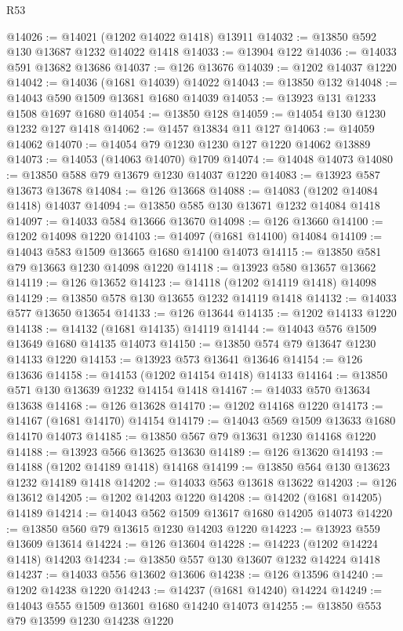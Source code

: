 \begin{lexlean}{R53}
\begin{coremodule}
@14026 := @14021 (@1202 @14022 @1418) @13911
@14032 := @13850 @592 @130 @13687 @1232 @14022 @1418
@14033 := @13904 @122
@14036 := @14033 @591 @13682 @13686
@14037 := @126 @13676
@14039 := @1202 @14037 @1220
@14042 := @14036 (@1681 @14039) @14022
@14043 := @13850 @132
@14048 := @14043 @590 @1509 @13681 @1680 @14039
@14053 := @13923 @131 @1233 @1508 @1697 @1680
@14054 := @13850 @128
@14059 := @14054 @130 @1230 @1232 @127 @1418
@14062 := @1457 @13834 @11 @127
@14063 := @14059 @14062
@14070 := @14054 @79 @1230 @1230 @127 @1220 @14062 @13889
@14073 := @14053 (@14063 @14070) @1709
@14074 := @14048 @14073
@14080 := @13850 @588 @79 @13679 @1230 @14037 @1220
@14083 := @13923 @587 @13673 @13678
@14084 := @126 @13668
@14088 := @14083 (@1202 @14084 @1418) @14037
@14094 := @13850 @585 @130 @13671 @1232 @14084 @1418
@14097 := @14033 @584 @13666 @13670
@14098 := @126 @13660
@14100 := @1202 @14098 @1220
@14103 := @14097 (@1681 @14100) @14084
@14109 := @14043 @583 @1509 @13665 @1680 @14100 @14073
@14115 := @13850 @581 @79 @13663 @1230 @14098 @1220
@14118 := @13923 @580 @13657 @13662
@14119 := @126 @13652
@14123 := @14118 (@1202 @14119 @1418) @14098
@14129 := @13850 @578 @130 @13655 @1232 @14119 @1418
@14132 := @14033 @577 @13650 @13654
@14133 := @126 @13644
@14135 := @1202 @14133 @1220
@14138 := @14132 (@1681 @14135) @14119
@14144 := @14043 @576 @1509 @13649 @1680 @14135 @14073
@14150 := @13850 @574 @79 @13647 @1230 @14133 @1220
@14153 := @13923 @573 @13641 @13646
@14154 := @126 @13636
@14158 := @14153 (@1202 @14154 @1418) @14133
@14164 := @13850 @571 @130 @13639 @1232 @14154 @1418
@14167 := @14033 @570 @13634 @13638
@14168 := @126 @13628
@14170 := @1202 @14168 @1220
@14173 := @14167 (@1681 @14170) @14154
@14179 := @14043 @569 @1509 @13633 @1680 @14170 @14073
@14185 := @13850 @567 @79 @13631 @1230 @14168 @1220
@14188 := @13923 @566 @13625 @13630
@14189 := @126 @13620
@14193 := @14188 (@1202 @14189 @1418) @14168
@14199 := @13850 @564 @130 @13623 @1232 @14189 @1418
@14202 := @14033 @563 @13618 @13622
@14203 := @126 @13612
@14205 := @1202 @14203 @1220
@14208 := @14202 (@1681 @14205) @14189
@14214 := @14043 @562 @1509 @13617 @1680 @14205 @14073
@14220 := @13850 @560 @79 @13615 @1230 @14203 @1220
@14223 := @13923 @559 @13609 @13614
@14224 := @126 @13604
@14228 := @14223 (@1202 @14224 @1418) @14203
@14234 := @13850 @557 @130 @13607 @1232 @14224 @1418
@14237 := @14033 @556 @13602 @13606
@14238 := @126 @13596
@14240 := @1202 @14238 @1220
@14243 := @14237 (@1681 @14240) @14224
@14249 := @14043 @555 @1509 @13601 @1680 @14240 @14073
@14255 := @13850 @553 @79 @13599 @1230 @14238 @1220

\end{coremodule}
\end{lexlean}
